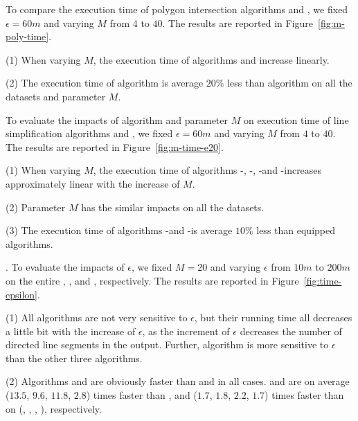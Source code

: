 To compare the execution time of polygon intersection algorithms \rpia and \cpia, we fixed $\epsilon =60m$ and varying $M$ from $4$ to $40$.
%
The results are reported in Figure~\ref{fig:m-poly-time}.


\ni(1) When varying $M$, the execution time of algorithms \rpia and \cpia increase linearly.

\ni(2) The execution time of algorithm \rpia is average \textcolor[rgb]{1.00,0.00,0.00}{$20\%$ }less than algorithm \cpia on all the datasets and parameter $M$.





To evaluate the impacts of algorithm \rpia and parameter $M$ on execution time of line simplification algorithms \cist and \cista, we fixed $\epsilon =60m$ and varying $M$ from $4$ to $40$.
%
The results are reported in Figure~\ref{fig:m-time-e20}. %

\ni(1) When varying $M$, the execution time of algorithms \cist-\rpia, \cist-\cpia, \cista-\rpia and \cista-\cpia increases approximately linear with the increase of $M$.

\ni(2) Parameter $M$ has the similar impacts on all the datasets.

\ni(3) The execution time of algorithms \cist-\rpia and \cista-\rpia is average \textcolor[rgb]{1.00,0.00,0.00}{$10\%$} less than \cpia equipped algorithms.




.
To evaluate the impacts of $\epsilon$, we fixed $M=20$ and varying $\epsilon$  from $10m$ to $200m$ on the entire \truck, \sercar, \geolife and \pricar, respectively.
The results are reported in Figure~\ref{fig:time-epsilon}.

\ni(1) All algorithms are not very sensitive to $\epsilon$, but their running time all decreases a little bit with the increase of $\epsilon$, as the increment of $\epsilon$ decreases the number of directed line segments in the output.
Further, algorithm \dpa is more sensitive to $\epsilon$ than the other three algorithms.

\ni(2) Algorithms \cist and \cista are obviously faster than \dpa and \squishe in all cases.
\cist and \cista are on average ($13.5$, $9.6$, $11.8$, {$2.8$}) times faster than \dpa, and {($1.7$, $1.8$, $2.2$, {$1.7$}) times faster} than \squishe on (\truck, \sercar, {\geolife}, \pricar), respectively.


